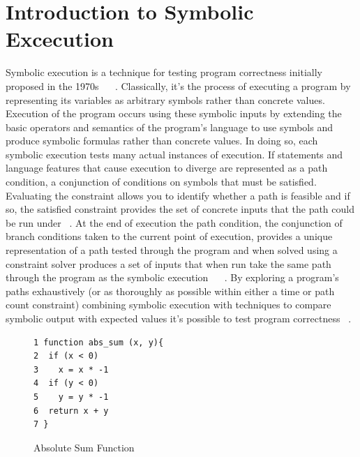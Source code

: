 \documentclass[]{final_report}
\begin{document}
\section{Introduction to Symbolic Excecution}

Symbolic execution is a technique for testing program correctness initially proposed in the 1970s ~\cite{king1976symbolic} ~\cite{boyer1975select}. Classically, it's the process of executing a program by representing its variables as arbitrary symbols rather than concrete values. Execution of the program occurs using these symbolic inputs by extending the basic operators and semantics of the program's language to use symbols and produce symbolic formulas rather than concrete values. In doing so, each symbolic execution tests many actual instances of execution. If statements and language features that cause execution to diverge are represented as a path condition, a conjunction of conditions on symbols that must be satisfied. Evaluating the constraint allows you to identify whether a path is feasible and if so, the satisfied constraint provides the set of concrete inputs that the path could be run under ~\cite{1976}. At the end of execution the path condition, the conjunction of branch conditions taken to the current point of execution, provides a unique representation of a path tested through the program and when solved using a constraint solver produces a set of inputs that when run take the same path through the program as the symbolic execution ~\cite{godefroid2008automated} ~\cite{godefroid2005dart}. By exploring a program's paths exhaustively (or as thoroughly as possible within either a time or path count constraint) combining symbolic execution with techniques to compare symbolic output with expected values it's possible to test program correctness ~\cite{king1976symbolic}.

\begin{figure}[h]
\begin{verbatim}
1 function abs_sum (x, y){
2  if (x < 0)
3    x = x * -1
4  if (y < 0)
5    y = y * -1
6  return x + y
7 }
\end{verbatim}
\caption{\label{fig:abs-sum} Absolute Sum Function}
\end{figure} 
\end{document}
